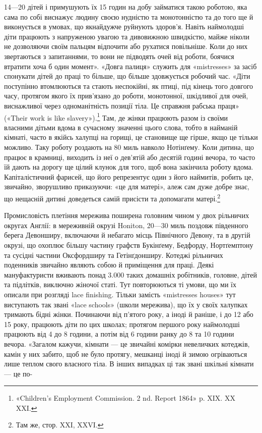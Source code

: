 14—20 дітей і примушують їх 15 годин на добу займатися такою
роботою, яка сама по собі виснажує людину своєю нудністю та
монотонністю та до того ще й виконується в умовах, що якнайдужче
руйнують здоров’я. Навіть наймолодші діти працюють з
напруженою увагою та дивовижною швидкістю, майже ніколи
не дозволяючи своїм пальцям відпочити або рухатися повільніше.
Коли до них звертаються з запитаннями, то вони не підводять очей
від роботи, боячися втратити хоча б один момент». «Довга палиця»
служить для «mistresses» за засіб спонукати дітей до праці то
більше, що більше здовжується робочий час. «Діти поступінно
втомлюються та стають неспокійні, як птиці, під кінець того довгого
часу, протягом якого їх прив’язано до роботи, монотонної, шкідливої
для очей, виснажливої через одноманітність позиції тіла.
Це справжня рабська праця» («Their work is like slavery»).\footnote{
«Children’s Employment Commission. 2 nd. Report 1864» p. XIX.
XX XXI.
}
Там, де жінки працюють разом із своїми власними дітьми вдома
в сучасному значенні цього слова, тобто в найманій кімнаті,
часто в якійсь халупці на горищі, це становище ще гірше, якщо
це тільки можливо. Таку роботу роздають на 80 миль навколо
Нотінґему. Коли дитина, що працює в крамниці, виходить із неї
о дев’ятій або десятій годині вечора, то часто їй дають на дорогу
ще цілий клунок для того, щоб вона закінчила роботу вдома.
Капіталістичний фарисей, що його репрезентує один з його наймитів,
робить це, звичайно, зворушливо приказуючи: «це для
матері», алеж сам дуже добре знає, що нещасній дитині доведеться
самій присісти та допомагати матері.\footnote{
Там же, стор. XXI, XXVI.
}

Промисловість плетіння мережива поширена головним чином
у двох рільничих округах Англії: в мереживній окрузі Honiton,
20—30 миль поздовж південного берега Девонширу, включаючи
й небагато місць Північного Девону, та в другій окрузі, що
охоплює більшу частину графств Букінґему, Бедфорду, Нортґемптону
та сусідні частини Оксфордширу та Гетінґдонширу.
Котеджі рільничих поденників звичайно являють собою й приміщення
для праці. Деякі мануфактуристи вживають понад
3.000 таких домашніх робітників, головне, дітей та підлітків,
виключно жіночої статі. Тут повторюються ті умови, що ми їх
описали при розгляді lace finishing. Тільки замість «mistresses
houses» тут виступають так звані «lace schools» (школи мережива),
що їх у своїх халупках тримають бідні жінки. Починаючи від
п’ятого року, а іноді й раніше, і до 12 або 15 року, працюють
діти по цих школах; протягом першого року наймолодші працюють
від 4 до 8 години, а потім від 6 години ранку до 8 та 10 години
вечора. «Загалом кажучи, кімнати — це звичайні комірки невеличких
котеджів, камін у них забито, щоб не було протягу, мешканці
іноді й зимою огріваються лише теплом свого власного
тіла. В інших випадках ці так звані шкільні кімнати — це по-